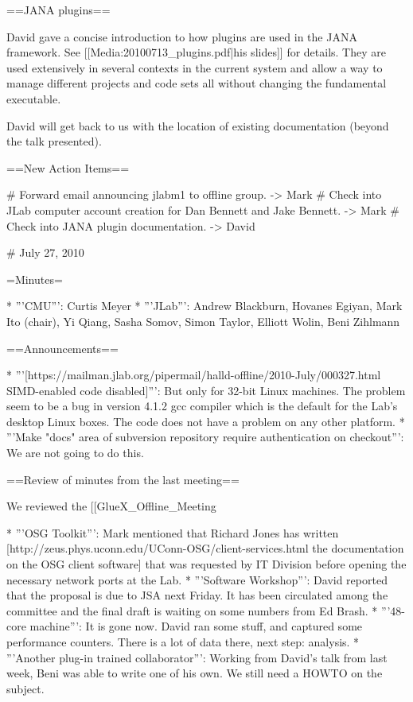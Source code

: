 ==JANA plugins==

David gave a concise introduction to how plugins are used in the JANA framework. See [[Media:20100713_plugins.pdf|his slides]] for details. They are used extensively in several contexts in the current system and allow a way to manage different projects and code sets all without changing the fundamental executable.

David will get back to us with the location of existing documentation (beyond the talk presented).

==New Action Items==

# Forward email announcing jlabm1 to offline group. -> Mark
# Check into JLab computer account creation for Dan Bennett and Jake Bennett. -> Mark
# Check into JANA plugin documentation. -> David


# July 27, 2010

=Minutes=

* '''CMU''': Curtis Meyer
* '''JLab''': Andrew Blackburn, Hovanes Egiyan, Mark Ito (chair), Yi Qiang, Sasha Somov, Simon Taylor, Elliott Wolin, Beni Zihlmann

==Announcements==

* '''[https://mailman.jlab.org/pipermail/halld-offline/2010-July/000327.html SIMD-enabled code disabled]''': But only for 32-bit Linux machines. The problem seem to be a bug in version 4.1.2 gcc compiler which is the default for the Lab's desktop Linux boxes. The code does not have a problem on any other platform.
* '''Make "docs" area of subversion repository require authentication on checkout''': We are not going to do this.

==Review of minutes from the last meeting==

We reviewed the [[GlueX_Offline_Meeting%

* '''OSG Toolkit''': Mark mentioned that Richard Jones has written [http://zeus.phys.uconn.edu/UConn-OSG/client-services.html the documentation on the OSG client software] that was requested by IT Division before opening the necessary network ports at the Lab.
* '''Software Workshop''': David reported that the proposal is due to JSA next Friday. It has been circulated among the committee and the final draft is waiting on some numbers from Ed Brash.
* '''48-core machine''': It is gone now. David ran some stuff, and captured some performance counters. There is a lot of data there, next step: analysis.
* '''Another plug-in trained collaborator''': Working from David's talk from last week, Beni was able to write one of his own. We still need a HOWTO on the subject.

